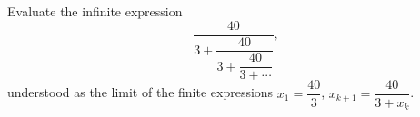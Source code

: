 Evaluate the infinite expression
\[
\dfrac{40}{3+\dfrac{40}{3+\dfrac{40}{3+\cdots}}},
\]
understood as the limit of the finite expressions $x_1=\dfrac{40}{3}$, $x_{k+1}=\dfrac{40}{3+x_k}$.
